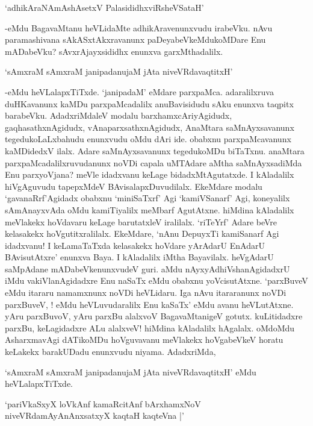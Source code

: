 \begin{shloka}
`adhikAraNAmAshAsetxV PalasididhxviRsheVSataH'
\end{shloka}

-eMdu BagavaMtanu heVLidaMte adhikAravenunxvudu irabeVku. nAvu paramashivana sAkASxtAkxravanunx paDeyabeVkeMdukoMDare Enu mADabeVku? sAvxrAjayxsididhx enunxva garxMthadalilx.

\begin{shloka}
`sAmxraM sAmxraM janipadanujaM jAta niveVRdavaqtitxH'
\end{shloka}

-eMdu heVLalapxTiTxde. `janipadaM' eMdare parxpaMca. adaralilxruva duHKavanunx kaMDu parxpaMcadalilx anuBavisidudu sAku enunxva taqpitx barabeVku. AdadxriMdaleV modalu barxhamxcAriyAgidudx, gaqhasathxnAgidudx, vAnaparxsathxnAgidudx, AnaMtara saMnAyxsavanunx tegedukoLaLxbahudu enunxvudu oMdu dAri ide. obabxnu parxpaMcavanunx kaMDidedxV ilalx. Adare saMnAyxsavanunx tegedukoMDu biTaTxnu. anaMtara parxpaMcadalilxruvudanunx noVDi capala uMTAdare aMtha saMnAyxsadiMda Enu parxyoVjana? meVle idadxvanu keLage bidadxMtAgutatxde. I kAladalilx hiVgAguvudu tapepxMdeV BAvisalapxDuvudilalx. EkeMdare modalu `gavanaRrf'Agidadx obabxnu `miniSaTxrf' Agi `kamiVSanarf' Agi, koneyalilx sAmAnayxvAda oMdu kamiTiyalilx meMbarf AgutAtxne. hiMdina kAladalilx meVlakekx hoVdavaru keLage barutatxleV iralilalx. `riTeYrf' Adare beVre kelasakekx hoVgutitxralilalx. EkeMdare, `nAnu DepuyxTi kamiSanarf Agi idadxvanu! I keLamaTaTxda kelasakekx hoVdare yArAdarU EnAdarU BAvisutAtxre' enunxva Baya. I kAladalilx iMtha Bayavilalx. heVgAdarU saMpAdane mADabeVkenunxvudeV guri. aMdu nAyxyAdhiVshanAgidadxrU iMdu vakiVlanAgidadxre Enu naSaTx eMdu obabxnu yoVcisutAtxne. `parxBuveV eMdu itararu namamxnunx noVDi heVLidaru. Iga nAvu itararanunx noVDi parxBuveV, ! eMdu heVLuvudaralilx Enu kaSaTx' eMdu avanu heVLutAtxne. yAru parxBuvoV, yAru parxBu alalxvoV BagavaMtanigeV gotutx. kuLitidadxre parxBu, keLagidadxre ALu alalxveV! hiMdina kAladalilx hAgalalx. oMdoMdu AsharxmavAgi dATikoMDu hoVguvavanu meVlakekx hoVgabeVkeV horatu keLakekx barakUDadu enunxvudu niyama. AdadxriMda, 

`sAmxraM sAmxraM janipadanujaM jAta niveVRdavaqtitxH' eMdu heVLalapxTiTxde.

\begin{shloka}
`pariVkaSxyX loVkAnf kamaRcitAnf bArxhamxNoV\\
niveVRdamAyAnAnxsatxyX kaqtaH kaqteVna |'
\end{shloka}

